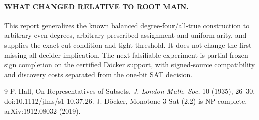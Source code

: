 \documentclass[11pt]{article}
\begin{document}
\paragraph{WHAT CHANGED RELATIVE TO ROOT MAIN.} This report generalizes the known balanced degree-four/all-true construction to arbitrary even degrees, arbitrary prescribed assignment and uniform arity, and supplies the exact cut condition and tight threshold. It does not change the first missing all-decider implication. The next falsifiable experiment is partial frozen-sign completion on the certified D\"ocker support, with signed-source compatibility and discovery costs separated from the one-bit SAT decision.
\begin{thebibliography}{9}
 P. Hall, On Representatives of Subsets, \emph{J. London Math. Soc.} 10 (1935), 26--30, doi:10.1112/jlms/s1-10.37.26.
 J. D\"ocker, Monotone 3-Sat-(2,2) is NP-complete, arXiv:1912.08032 (2019).
\end{thebibliography}
\end{document}
